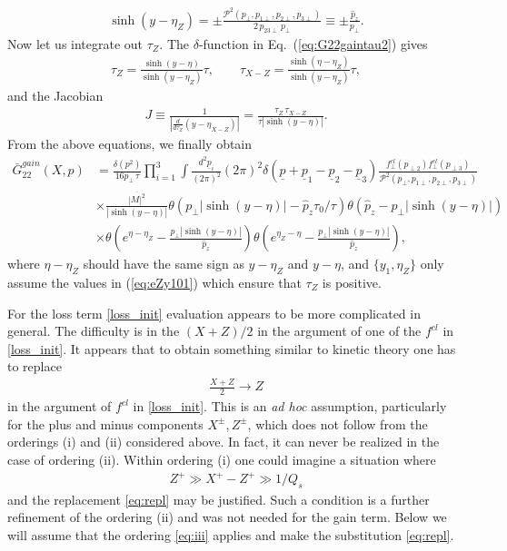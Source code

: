 \documentclass[onecolumn,showpacs,nobibnotes,nofootinbib,12pt,aps,prd,showpacs,notitlepage,nofootinbib,preprintnumbers,amsmath,amssymb]{article}
\def\eq#1{{Eq.~(\ref{#1})}}
\begin{document}
\begin{align}
  \sinh(y-\eta_Z)=\pm\frac{\mathcal{P}^2(p_\perp,p_{1\perp},
    p_{2\perp}, p_{3\perp})}{2 \, p_{23\perp} \,
    p_\perp}\equiv\pm\frac{\hat{p}_z}{p_\perp}.
\end{align}
Now let us integrate out $\tau_Z$. The $\delta$-function in
\eq{eq:G22gaintau2} gives
\begin{align}
  \tau _Z= \frac{\sinh (y-\eta )}{\sinh (y-\eta_Z)}\tau,\qquad
  \tau_{X-Z}=\frac{\sinh (\eta-\eta_Z )}{\sinh (y-\eta_Z)}\tau,
\end{align}
and the Jacobian
\begin{align}
  J\equiv\frac{1}{\left|\frac{d}{d\tau_Z}(y-\eta_{X-Z})\right|}=\frac{\tau_{Z}
    \, \tau_{X-Z}}{\tau |\sinh (y-\eta)|}.
\end{align}
From the above equations, we finally obtain
\begin{align}
  \bar G_{22}^{gain}(X,p)&=\frac{\delta(p^2)}{16p_\perp \, \tau}\prod\limits_{i=1}^3\int\frac{d^2\underline{p}_i}{(2\pi)^2}(2\pi)^2\delta(\underline{p}+\underline{p}_1-\underline{p}_2-\underline{p}_3)\frac{f_\perp^{cl}(p_{\perp2})f_\perp^{cl}(p_{\perp3})}{\mathcal{P}^2(p_\perp,p_{1\perp}, p_{2\perp}, p_{3\perp})}\nonumber\\
  &\times\frac{\overline{|M|^2}}{|\sinh(y-\eta )|}\theta\left(p_\perp|\sinh  (y-\eta )|-\hat{p}_z \tau_0/\tau\right)\theta\left(\hat{p}_z-p_\perp|\sinh  (y-\eta )|\right)\nonumber\\
  &\times\theta\left(e^{\eta-\eta_Z}- \frac{p_\perp|\sinh (y-\eta
      )|}{\hat{p}_z}\right)\theta\left(e^{\eta_Z-\eta}-
    \frac{p_\perp|\sinh (y-\eta )|}{\hat{p}_z}\right), \label{gain_final}
\end{align}
where $\eta-\eta_Z$ should have the same sign as $y-\eta_Z$ and
$y-\eta$, and $\{y_1,\eta_Z\}$ only assume the values in
(\ref{eq:eZy101}) which ensure that $\tau_Z$ is positive.


For the loss term \eqref{loss_init} evaluation appears to be more
complicated in general. The difficulty is in the $(X+Z)/2$ in the
argument of one of the $f^{cl}$ in \eqref{loss_init}. It appears that
to obtain something similar to kinetic theory one has to replace
\begin{align}
  \label{eq:repl}
  \frac{X+Z}{2} \to Z
\end{align}
in the argument of $f^{cl}$ in \eqref{loss_init}. This is an {\sl ad
  hoc} assumption, particularly for the plus and minus components
$X^\pm, Z^\pm$, which does not follow from the orderings (i) and (ii)
considered above. In fact, it can never be realized in the case of
ordering (ii). Within ordering (i) one could imagine a situation where
\begin{align}
  \label{eq:iii}
  Z^+ \gg X^+ - Z^+ \gg 1/Q_s
\end{align}
and the replacement \eqref{eq:repl} may be justified. Such a condition
is a further refinement of the ordering (ii) and was not needed for
the gain term. Below we will assume that the ordering \eqref{eq:iii}
applies and make the substitution \eqref{eq:repl}.
\end{document}
